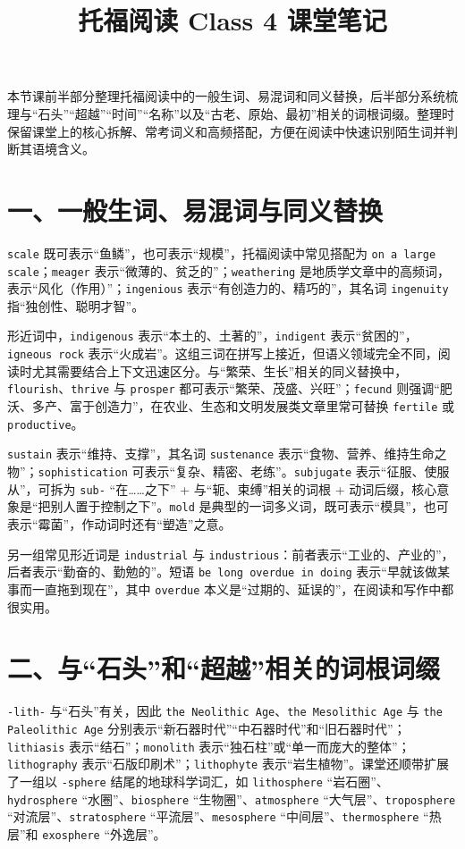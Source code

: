 \documentclass[UTF8,zihao=-4]{ctexart}
\title{\heiti 托福阅读 Class 4 课堂笔记}
\author{}
\date{}
\begin{document}
\maketitle
\thispagestyle{fancy}

本节课前半部分整理托福阅读中的一般生词、易混词和同义替换，后半部分系统梳理与“石头”“超越”“时间”“名称”以及“古老、原始、最初”相关的词根词缀。整理时保留课堂上的核心拆解、常考词义和高频搭配，方便在阅读中快速识别陌生词并判断其语境含义。

\section*{一、一般生词、易混词与同义替换}

\texttt{scale} 既可表示“鱼鳞”，也可表示“规模”，托福阅读中常见搭配为 \texttt{on a large scale}；\texttt{meager} 表示“微薄的、贫乏的”；\texttt{weathering} 是地质学文章中的高频词，表示“风化（作用）”；\texttt{ingenious} 表示“有创造力的、精巧的”，其名词 \texttt{ingenuity} 指“独创性、聪明才智”。

形近词中，\texttt{indigenous} 表示“本土的、土著的”，\texttt{indigent} 表示“贫困的”，\texttt{igneous rock} 表示“火成岩”。这组三词在拼写上接近，但语义领域完全不同，阅读时尤其需要结合上下文迅速区分。与“繁荣、生长”相关的同义替换中，\texttt{flourish}、\texttt{thrive} 与 \texttt{prosper} 都可表示“繁荣、茂盛、兴旺”；\texttt{fecund} 则强调“肥沃、多产、富于创造力”，在农业、生态和文明发展类文章里常可替换 \texttt{fertile} 或 \texttt{productive}。

\texttt{sustain} 表示“维持、支撑”，其名词 \texttt{sustenance} 表示“食物、营养、维持生命之物”；\texttt{sophistication} 可表示“复杂、精密、老练”。\texttt{subjugate} 表示“征服、使服从”，可拆为 \texttt{sub-} “在……之下” + 与“轭、束缚”相关的词根 + 动词后缀，核心意象是“把别人置于控制之下”。\texttt{mold} 是典型的一词多义词，既可表示“模具”，也可表示“霉菌”，作动词时还有“塑造”之意。

另一组常见形近词是 \texttt{industrial} 与 \texttt{industrious}：前者表示“工业的、产业的”，后者表示“勤奋的、勤勉的”。短语 \texttt{be long overdue in doing} 表示“早就该做某事而一直拖到现在”，其中 \texttt{overdue} 本义是“过期的、延误的”，在阅读和写作中都很实用。

\section*{二、与“石头”和“超越”相关的词根词缀}

\texttt{-lith-} 与“石头”有关，因此 \texttt{the Neolithic Age}、\texttt{the Mesolithic Age} 与 \texttt{the Paleolithic Age} 分别表示“新石器时代”“中石器时代”和“旧石器时代”；\texttt{lithiasis} 表示“结石”；\texttt{monolith} 表示“独石柱”或“单一而庞大的整体”；\texttt{lithography} 表示“石版印刷术”；\texttt{lithophyte} 表示“岩生植物”。课堂还顺带扩展了一组以 \texttt{-sphere} 结尾的地球科学词汇，如 \texttt{lithosphere} “岩石圈”、\texttt{hydrosphere} “水圈”、\texttt{biosphere} “生物圈”、\texttt{atmosphere} “大气层”、\texttt{troposphere} “对流层”、\texttt{stratosphere} “平流层”、\texttt{mesosphere} “中间层”、\texttt{thermosphere} “热层”和 \texttt{exosphere} “外逸层”。
\end{document}
